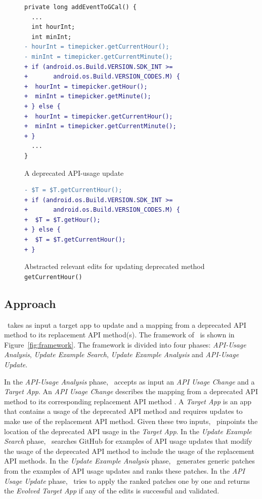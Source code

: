 \begin{figure}[htb]
\centering
\begin{lstlisting}[language=diff,numbers=none]
private long addEventToGCal() {
  ...
  int hourInt;
  int minInt;
- hourInt = timepicker.getCurrentHour();
- minInt = timepicker.getCurrentMinute();
+ if (android.os.Build.VERSION.SDK_INT >= 
+       android.os.Build.VERSION_CODES.M) {
+  hourInt = timepicker.getHour();
+  minInt = timepicker.getMinute();
+ } else {
+  hourInt = timepicker.getCurrentHour();
+  minInt = timepicker.getCurrentMinute();
+ }
  ...
}
\end{lstlisting}
\caption{A deprecated API-usage update}
\label{fig:deprecated_api_update_example}
\end{figure}

\begin{figure}[htb]
\centering
\begin{lstlisting}[language=diff,numbers=none]
- $T = $T.getCurrentHour();
+ if (android.os.Build.VERSION.SDK_INT >= 
+       android.os.Build.VERSION_CODES.M) {
+  $T = $T.getHour();
+ } else {
+  $T = $T.getCurrentHour();
+ }
\end{lstlisting}
\caption{Abstracted relevant edits for updating deprecated method \texttt{getCurrentHour()}}
\label{fig:deprecated_api_update_edits}
\end{figure}

\subsection{Approach}
\toolname\ takes as input a target app to update and a mapping from a
deprecated API method  to its replacement API method(s). The
framework of \toolname\ is shown in Figure~\ref{fig:framework}. The
framework is divided into four phases: {\em API-Usage Analysis}, {\em
  Update Example Search}, {\em Update Example Analysis} and {\em API-Usage
  Update}.

In the {\em API-Usage Analysis} phase, \toolname\ accepts as input an {\em
  API Usage Change} and a {\em Target App}. An {\em API Usage Change}
describes the mapping from a deprecated API method to its corresponding
replacement API method  . A {\em Target App} is an app
that contains a usage of the deprecated API method and requires updates to
make use of the replacement API method. Given these two inputs,
\toolname\ pinpoints the location of the deprecated API usage in the {\em
  Target App}. In the {\em Update Example Search} phase,
\toolname\ searches GitHub for examples of API usage updates that modify
the usage of the deprecated API method to include the usage of the
replacement API methods. In the {\em Update Example Analysis} phase,
\toolname\ generates generic patches  from the examples of API usage updates and ranks these patches. In
the {\em API Usage Update} phase, \toolname\ tries to apply the ranked
patches one by one and returns the {\em Evolved Target App} if any of the
edits is successful and validated.

